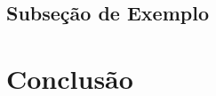 \documentclass[12pt,oneside,a4paper,article]{abntex2}
\begin{document}
\subsection{Subseção de Exemplo}
\lipsum[7]

\section{Conclusão}
\lipsum[8-9]



\end{document}
